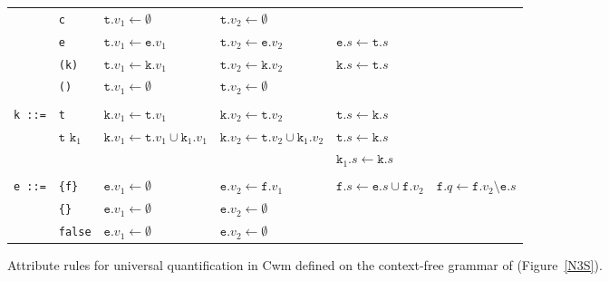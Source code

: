\begin{figure*}
\begin{minipage}{0.95\textwidth}
\begin{center}
\begin{tabular}{llllll}
      & \texttt{c} &               $\texttt{t}.v_1 \leftarrow\emptyset$&  $\texttt{t}.v_2 \leftarrow\emptyset$& &\\ %
      & \texttt{e} &                $\texttt{t}.v_1 \leftarrow\texttt{e}.v_1 $ &  $\texttt{t}.v_2 \leftarrow\texttt{e}.v_2 $& $\texttt{e}.s\leftarrow \texttt{t}.s$\\
      & \texttt{(k)}& $\texttt{t}.v_1 \leftarrow\texttt{k}.v_1$ &$\texttt{t}.v_2 \leftarrow\texttt{k}.v_2$& $\texttt{k}.s\leftarrow \texttt{t}.s$\\
      & \texttt{()}& $\texttt{t}.v_1 \leftarrow\emptyset$&  $\texttt{t}.v_2 \leftarrow\emptyset$\\
      &&&\\
\texttt{k ::=}& \texttt{t}& $\texttt{k}.v_1 \leftarrow\texttt{t}.v_1$ & $\texttt{k}.v_2 \leftarrow\texttt{t}.v_2$& $\texttt{t}.s\leftarrow \texttt{k}.s$\\
&$\texttt{t k}_1$ & $\texttt{k}.v_1 \leftarrow\texttt{t}.v_1\cup\texttt{k}_1.v_1$ & $\texttt{k}.v_2 \leftarrow\texttt{t}.v_2\cup\texttt{k}_1.v_2$& $\texttt{t}.s\leftarrow \texttt{k}.s$\\
&&&& $\texttt{k}_1.s\leftarrow \texttt{k}.s$\\
&&&\\
\texttt{e ::=}&\texttt{\{f\}} &                $\texttt{e}.v_1 \leftarrow\emptyset$ &  $\texttt{e}.v_2 \leftarrow\texttt{f}.v_1$& $\texttt{f}.s\leftarrow \texttt{e}.s \cup \texttt{f}.v_2$& $\texttt{f}.q \leftarrow \texttt{f}.v_2 \setminus \texttt{e}.s$\\
       &\texttt{\{\}} &  $\texttt{e}.v_1 \leftarrow\emptyset$ &  $\texttt{e}.v_2 \leftarrow\emptyset$\\
       &\texttt{false}       &                $\texttt{e}.v_1 \leftarrow\emptyset$&                $\texttt{e}.v_2 \leftarrow\emptyset$\\
  \hline

\end{tabular}
\end{center}   \normalsize
\caption{Attribute rules for universal quantification in Cwm defined on the context-free grammar of \nthree (Figure~\ref{N3S}).\label{uniatt}}
\end{minipage}
\end{figure*}


